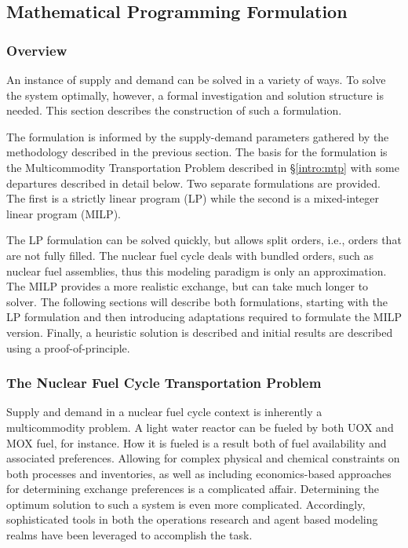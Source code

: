\subsection{Mathematical Programming Formulation}\label{abm:dre:form}

\subsubsection{Overview}

An instance of supply and demand can be solved in a variety of ways. To solve
the system optimally, however, a formal investigation and solution structure is
needed. This section describes the construction of such a formulation.

The formulation is informed by the supply-demand parameters gathered by the
methodology described in the previous section. The basis for the formulation is
the Multicommodity Transportation Problem described in \S\ref{intro:mtp} with
some departures described in detail below. Two separate formulations are
provided. The first is a strictly linear program (LP) while the second is a
mixed-integer linear program (MILP).

The LP formulation can be solved quickly, but allows split orders, i.e., orders
that are not fully filled. The nuclear fuel cycle deals with bundled orders,
such as nuclear fuel assemblies, thus this modeling paradigm is only an
approximation. The MILP provides a more realistic exchange, but can take much
longer to solver. The following sections will describe both formulations,
starting with the LP formulation and then introducing adaptations required to
formulate the MILP version. Finally, a heuristic solution is described and
initial results are described using a proof-of-principle.

\subsubsection{The Nuclear Fuel Cycle Transportation Problem}

Supply and demand in a nuclear fuel cycle context is inherently a multicommodity
problem. A light water reactor can be fueled by both UOX and MOX fuel, for
instance. How it is fueled is a result both of fuel availability and associated
preferences. Allowing for complex physical and chemical constraints on both
processes and inventories, as well as including economics-based approaches for
determining exchange preferences is a complicated affair. Determining the
optimum solution to such a system is even more complicated. Accordingly,
sophisticated tools in both the operations research and agent based modeling
realms have been leveraged to accomplish the task.

